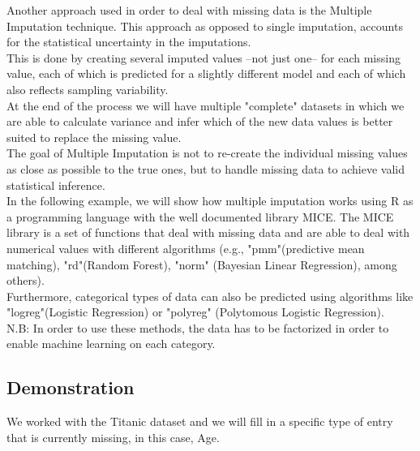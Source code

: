 \documentclass[a4paper]{article}
\begin{document}
Another approach used in order to deal with missing data is the Multiple Imputation technique. This approach as opposed to single imputation, accounts for the statistical uncertainty in the imputations.\cite{MICE}\\
This is done by creating several imputed values --not just one-- for each missing value, each of which is predicted for a slightly different model and each of which also reflects sampling variability.\cite{Gelmann}\\
At the end of the process we will have multiple "complete" datasets in which we are able to calculate variance and infer which of the new data values is better suited to replace the missing value.\\
The goal of Multiple Imputation is not to re-create the individual missing values as close as possible to the true ones, but to handle missing data to achieve valid statistical inference.\cite{Dealingwith}\\
In the following example, we will show how multiple imputation works using R as a programming language with the well documented library MICE. The MICE library is a set of functions that deal with missing data and are able to deal with numerical values with different algorithms (e.g., "pmm"(predictive mean matching), "rd"(Random Forest), "norm" (Bayesian Linear Regression), among others).\\
Furthermore, categorical types of data can also be predicted using algorithms like "logreg"(Logistic Regression) or "polyreg" (Polytomous Logistic Regression).\\
N.B: In order to use these methods, the data has to be factorized in order to enable machine learning on each category.\\
 
 \subsection*{Demonstration}
 We worked with the Titanic dataset and we will fill in a specific type of entry that is currently missing, in this case, Age.
 
\end{document}
